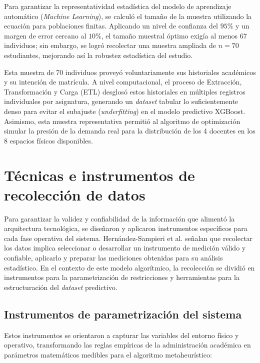Para garantizar la representatividad estadística del modelo de aprendizaje automático (\textit{Machine Learning}), se calculó el tamaño de la muestra utilizando la ecuación para poblaciones finitas. Aplicando un nivel de confianza del $95\%$ y un margen de error cercano al $10\%$, el tamaño muestral óptimo exigía al menos 67 individuos; sin embargo, se logró recolectar una muestra ampliada de $n = 70$ estudiantes, mejorando así la robustez estadística del estudio.

Esta muestra de 70 individuos proveyó voluntariamente sus historiales académicos y su intención de matrícula. A nivel computacional, el proceso de Extracción, Transformación y Carga (ETL) desglosó estos historiales en múltiples registros individuales por asignatura, generando un \textit{dataset} tabular lo suficientemente denso para evitar el subajuste (\textit{underfitting}) en el modelo predictivo XGBoost. Asimismo, esta muestra representativa permitió al algoritmo de optimización simular la presión de la demanda real para la distribución de los 4 docentes en los 8 espacios físicos disponibles.

\section{Técnicas e instrumentos de recolección de datos}
Para garantizar la validez y confiabilidad de la información que alimentó la arquitectura tecnológica, se diseñaron y aplicaron instrumentos específicos para cada fase operativa del sistema. Hernández-Sampieri et al. \cite{sampieri_metodologia_2014} señalan que recolectar los datos implica seleccionar o desarrollar un instrumento de medición válido y confiable, aplicarlo y preparar las mediciones obtenidas para su análisis estadístico. En el contexto de este modelo algorítmico, la recolección se dividió en instrumentos para la parametrización de restricciones y herramientas para la estructuración del \textit{dataset} predictivo.

\subsection{Instrumentos de parametrización del sistema}
Estos instrumentos se orientaron a capturar las variables del entorno físico y operativo, transformando las reglas empíricas de la administración académica en parámetros matemáticos medibles para el algoritmo metaheurístico:

